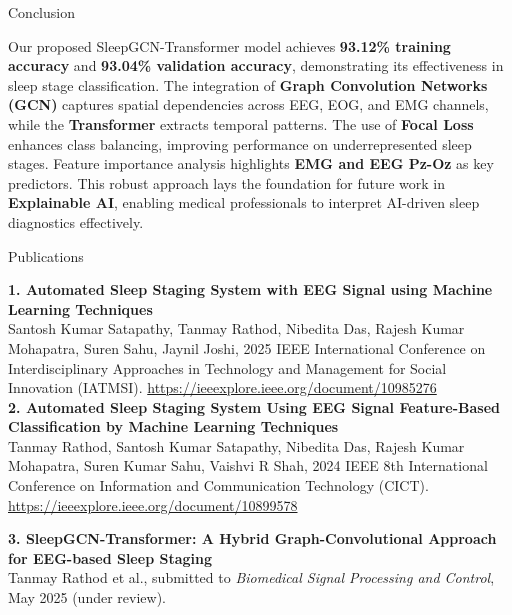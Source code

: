 \begin{frame}{Conclusion}
	\begin{block}{}
		Our proposed SleepGCN-Transformer model achieves \textbf{93.12\% training accuracy} and \textbf{93.04\% validation accuracy}, demonstrating its effectiveness in sleep stage classification. The integration of \textbf{Graph Convolution Networks (GCN)} captures spatial dependencies across EEG, EOG, and EMG channels, while the \textbf{Transformer} extracts temporal patterns. The use of \textbf{Focal Loss} enhances class balancing, improving performance on underrepresented sleep stages. Feature importance analysis highlights \textbf{EMG and EEG Pz-Oz} as key predictors. This robust approach lays the foundation for future work in \textbf{Explainable AI}, enabling medical professionals to interpret AI-driven sleep diagnostics effectively.
	\end{block}
\end{frame}

\begin{frame}{Publications}
	\begin{block}{}
		\textbf{1. Automated Sleep Staging System with EEG Signal using Machine Learning Techniques} \\
		Santosh Kumar Satapathy, Tanmay Rathod, Nibedita Das, Rajesh Kumar Mohapatra, Suren Sahu, Jaynil Joshi, 2025 IEEE International Conference on Interdisciplinary Approaches in Technology and Management for Social Innovation (IATMSI). \url{https://ieeexplore.ieee.org/document/10985276} \\
		
		\textbf{2. Automated Sleep Staging System Using EEG Signal Feature-Based Classification by Machine Learning Techniques} \\
		Tanmay Rathod, Santosh Kumar Satapathy, Nibedita Das, Rajesh Kumar Mohapatra, Suren Kumar Sahu, Vaishvi R Shah, 2024 IEEE 8th International Conference on Information and Communication Technology (CICT). \url{https://ieeexplore.ieee.org/document/10899578}
		
		\textbf{3. SleepGCN-Transformer: A Hybrid Graph-Convolutional Approach for EEG-based Sleep Staging} \\
		Tanmay Rathod et al., submitted to \textit{Biomedical Signal Processing and Control}, May 2025 (under review).
		
		\end{block}
\end{frame}

